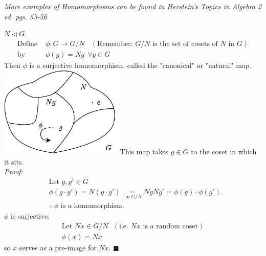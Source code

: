 \textit{More examples of Homomorphisms can be found in Herstein's Topics in Algebra 2 ed.  pgs. 55-56}\steezybreak\\

\begin{lemma}
$N\triangleleft G$,
\begin{align}
    \text{Define } &\phi: G\rightarrow G/N  \ \ \ \ (\text{Remember: }G/N \text{ is the set of cosets of } N \text{ in }G ) \nonumber \\
    \text{by } &\phi(g)=Ng \ \ \forall g \in G \nonumber
\end{align}
Then $\phi$ is a surjective homomorphism, called the "canonical" or "natural" map. \\
\includegraphics[width=0.45\textwidth]{Figures/natural_map.pdf}This map takes $g\in G$ to the coset in which it sits. \\

\noindent\textit{Proof:}
\begin{align}
    &\text{Let }g,g'\in G \nonumber \\
    &\phi(g\cdot g')= N(g\cdot g')\underset{\cdot \text{ in }G/N}{=} NgNg' = \phi(g)\cdot \phi(g'). \nonumber \\
    &\therefore \ \phi \text{ is a homomorphism.} \nonumber
\end{align}
$\phi$ is surjective: \\
\begin{align}
    \text{Let }Nx \in G/N \ \ \ (\text{i.e. } Nx \text{ is a random coset}) \nonumber \\
    \phi(x)=Nx \nonumber
\end{align}
so $x$ serves as a pre-image for $Nx$. $\blacksquare$
\end{lemma}


